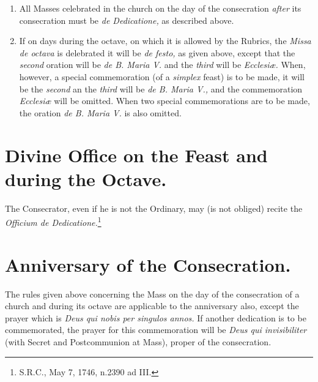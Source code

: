 \documentclass[letterpaper]{report}
\begin{document}
{\begin{enumerate}
    \item All Masses celebrated in the church on the day of the consecration
        \textit{after} its consecration must be \textit{de Dedicatione,} as
        described above.

    \item If on days during the octave, on which it is allowed by the Rubrics,
        the \textit{Missa de octava} is delebrated it will be \textit{de
        festo,} as given above, except that the \textit{second} oration will be
        \textit{de B. Maria V.} and the \textit{third} will be
        \textit{Ecclesi\ae.} When, however, a special commemoration (of a
        \textit{simplex} feast) is to be made, it will be the \textit{second}
        an the \textit{third} will be \textit{de B. Maria V.,} and the
        commemoration \textit{Ecclesi\ae} will be omitted. When two special
        commemorations are to be made, the oration \textit{de B. Maria V.} is
        also omitted.

\end{enumerate}

\section{Divine Office on the Feast and during the Octave.}

\rubric The Consecrator, even if he is not the Ordinary, may (is not obliged)
recite the \textit{Officium de Dedicatione.}\footnote{S.R.C., May 7, 1746,
n.2390 ad III.}

\section{Anniversary of the Consecration.}

\rubric The rules given above concerning the Mass on the day of the
consecration of a church and during its octave are applicable to the
anniversary also, except the prayer which is \textit{Deus qui nobis per
singulos annos.} If another dedication is to be commemorated, the prayer for
this commemoration will be \textit{Deus qui invisibiliter} (with Secret and
Postcommunion at Mass), proper of the consecration.

}

\printbibliography
    
\end{document}
